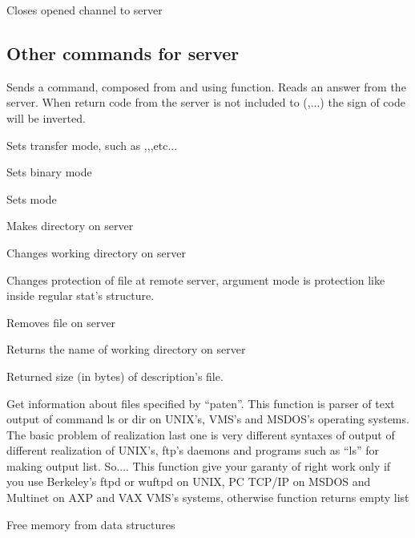 {Closes opened channel to server}

\subsection{Other commands for server}

{ Sends a command, composed from  and  using  function. 
Reads an answer from the server. 
When return code from the server is not included to (,...) the sign of code 
will be  inverted.}


{Sets transfer mode, such as ,,,etc...}

{Sets binary mode}

{Sets  mode}


{Makes  directory on server}

{Changes working directory on server}

{Changes protection of file at remote server, argument mode is protection like inside regular stat's structure.}

{Removes file on server}

{Returns the name of working directory on server}

{Returned size (in bytes) of description's file.}

{Get information about files specified by ``paten''. This function is parser
of text output of command ls or dir on UNIX's, VMS's and MSDOS's operating systems.
The basic problem of realization last one is very different syntaxes of output of
different realization of UNIX's, ftp's daemons and programs such as ``ls'' for making
output list. So.... This function give your garanty of right work only if you use
Berkeley's ftpd or wuftpd on UNIX, PC TCP/IP on MSDOS and Multinet on AXP and VAX VMS's
systems, otherwise function returns empty list}

{Free memory from data structures}

